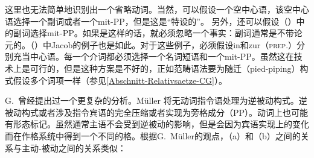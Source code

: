 \begin{exe}
\begin{xlist}[iv.]
\begin{exe}
\begin{xlist}[iv.]
\zl
这里也无法简单地识别出一个省略动词。当然，可以假设一个空中心语，该空中心语选择一个副词或者一个mit-PP，但是这是“特设的”。
另外，还可以假设（）中的副词选择mit-PP。如果是这样的话，就必须忽略一个事实：副词通常是不带论元的。（）中Jacob的例子也是如此。对于这些例子，必须假设in和zur（\textsc{prep}.）分别充当中心语。每一个介词都必须选择一个名词短语和一个mit-PP。虽然这在技术上是可行的，但是这种方案是不好的，正如范畴语法要为随迁（pied-piping）构式假设多个词项一样（参见\ref{Abschnitt-Relativsaetze-CG}）。

G.\  \citet{GMueller2009a}曾经提出过一个更复杂的分析。Müller 将无动词指令语处理为逆被动构式。逆被动构式或者涉及指令宾语的完全压缩或者实现为旁格成分（PP）。动词上也可能有形态标记。虽然通常主语不会受到逆被动的影响，但是会因为宾语实现上的变化而在作格系统中得到一个不同的格。根据G.\ Müller的观点，（a）和（b）之间的关系与主动-被动之间的关系类似：


\end{xlist}
\end{exe}
\end{xlist}
\end{exe}
